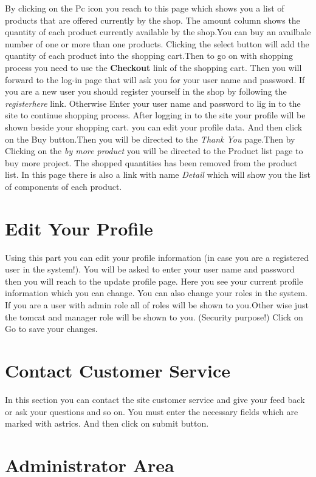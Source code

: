 \documentclass[a4paper,12pt]{article}
\begin{document}
By clicking on the Pc icon you reach to this page which shows you a list of products that are offered currently  
by the shop. The amount column shows the quantity of each product currently available by the shop.You can buy an availbale
number of one or more than one products. Clicking the select button will add the quantity of each product into the 
shopping cart.Then to go on with shopping process you need to use the {\bf Checkout } link of the shopping cart.
Then you will forward to the log-in page that will ask you for your user name and password. If you are a new user
you should register yourself in the shop by following the {\it registerhere} link. Otherwise Enter your user name 
and password to lig in to the site to continue shopping process.
After logging in to the site your profile will be shown beside your shopping cart. you can edit your profile data.
And then click on the Buy button.Then you will be directed to the {\it Thank You} page.Then by Clicking
on the {\it by more product} you will be directed to the Product list page to buy more project.
The shopped quantities has been removed from the product list.
In this page there is also a link with name {\it Detail} which will show you the list of components of each product.
 

\section*{Edit Your Profile}
Using this part you can edit your profile information (in case you are a registered user in the system!).
You will be asked to enter your user name and password then you will reach to the update profile page.
Here you see your current profile information which you can change. You can also change your roles in the system.
If you are a user with admin role all of roles will be shown to you.Other wise just the tomcat and manager role will 
be shown to you. (Security purpose!)
Click on Go to save your changes.

\section*{Contact Customer Service}

In this section you can contact the site customer service and give your feed back or ask your questions and so on.
You must enter the necessary fields which are marked with astrics.
And then click on submit button.



\section*{Administrator Area}
\end{document}
